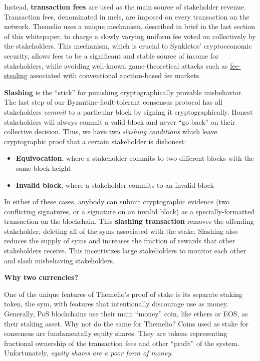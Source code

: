 \documentclass[]{article}
\providecommand{\tightlist}{%
  \setlength{\itemsep}{0pt}\setlength{\parskip}{0pt}}
\begin{document}
Instead, \textbf{transaction fees} are used as the main source of
stakeholder revenue. Transaction fees, denominated in mels, are imposed
on every transaction on the network. Themelio uses a unique mechanism,
described in brief in the last section of this whitepaper, to charge a
slowly varying uniform fee voted on collectively by the stakeholders.
This mechanism, which is crucial to Synkletos' cryptoeconomic security,
allows fees to be a significant and stable source of income for
stakeholders, while avoiding well-known game-theoretical attacks such as
\href{https://www.cs.princeton.edu/~smattw/CKWN-CCS16.pdf}{fee-stealing}
associated with conventional auction-based fee markets.

\textbf{Slashing} is the ``stick'' for punishing cryptographically
provable misbehavior. The last step of our Byzantine-fault-tolerant
consensus protocol has all stakeholders \emph{commit} to a particular
block by signing it cryptographically. Honest stakeholders will always
commit a valid block and never ``go back'' on their collective decision.
Thus, we have two \emph{slashing conditions} which leave cryptographic
proof that a certain stakeholder is dishonest:

\begin{itemize}
\tightlist
\item
  \textbf{Equivocation}, where a stakeholder commits to two different
  blocks with the same block height
\item
  \textbf{Invalid block}, where a stakeholder commits to an invalid
  block
\end{itemize}

In either of these cases, anybody can submit cryptographic evidence (two
conflicting signatures, or a signature on an invalid block) as a
specially-formatted transaction on the blockchain. This \textbf{slashing
transaction} removes the offending stakeholder, deleting all of the syms
associated with the stake. Slashing also reduces the supply of syms and
increases the fraction of rewards that other stakeholders receive. This
incentivizes large stakeholders to monitor each other and slash
misbehaving stakeholders.

\textbf{Why two currencies?}

One of the unique features of Themelio's proof of stake is its separate
staking token, the sym, with features that intentionally discourage use
as money. Generally, PoS blockchains use their main ``money'' coin, like
ethers or EOS, as their staking asset. Why not do the same for Themelio?
Coins used as stake for consensus are fundamentally equity shares. They
are tokens representing fractional ownership of the transaction fees and
other ``profit'' of the system. Unfortunately, \emph{equity shares are a
poor form of money}.
\end{document}
